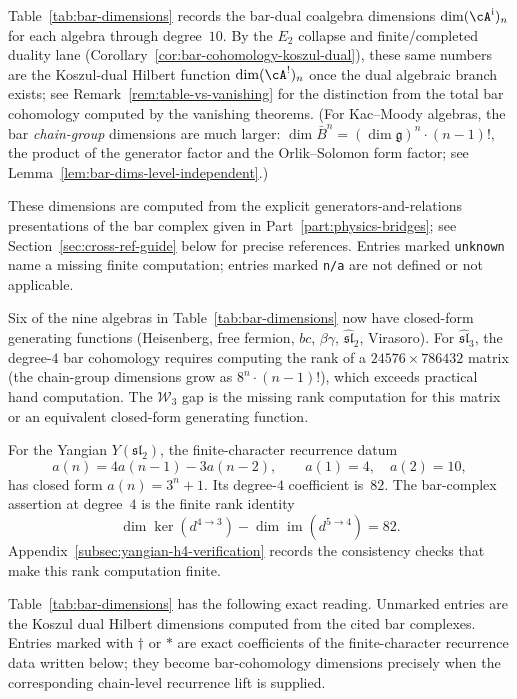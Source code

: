 Table~\ref{tab:bar-dimensions} records the bar-dual coalgebra dimensions
$\dim(\cA^{\mathrm i})_n$ for each algebra through degree~$10$.
By the $E_2$ collapse and finite/completed duality lane
(Corollary~\ref{cor:bar-cohomology-koszul-dual}), these same numbers are
the Koszul-dual Hilbert function $\dim(\cA^!)_n$ once the dual algebraic
branch exists; see
Remark~\ref{rem:table-vs-vanishing} for the distinction from the
total bar cohomology computed by the vanishing theorems.
(For Kac--Moody algebras, the bar \emph{chain-group} dimensions are much
larger: $\dim \bar{B}^n = (\dim\mathfrak{g})^n \cdot (n{-}1)!$,
the product of the generator factor and the Orlik--Solomon form
factor; see Lemma~\ref{lem:bar-dims-level-independent}.)

These dimensions are computed from the explicit
generators-and-relations
presentations of the bar complex given in Part~\ref{part:physics-bridges};
see Section~\ref{sec:cross-ref-guide} below for precise references.
Entries marked \texttt{unknown} name a missing finite computation;
entries marked \texttt{n/a} are not defined or not applicable.

Six of the nine algebras in Table~\ref{tab:bar-dimensions} now have
closed-form generating functions (Heisenberg, free fermion, $bc$,
$\beta\gamma$, $\widehat{\mathfrak{sl}}_2$, Virasoro).
For $\widehat{\mathfrak{sl}}_3$, the degree-$4$ bar cohomology
requires computing the rank of a $24576 \times 786432$ matrix
(the chain-group dimensions grow as $8^n \cdot (n{-}1)!$),
which exceeds practical hand computation. The $\mathcal{W}_3$ gap is
the missing rank computation for this matrix or an equivalent
closed-form generating function.

For the Yangian $Y(\mathfrak{sl}_2)$, the finite-character recurrence
datum
\[
a(n)=4a(n{-}1)-3a(n{-}2),\qquad a(1)=4,\quad a(2)=10,
\]
has closed form $a(n)=3^n+1$.  Its degree-$4$ coefficient is~$82$.
The bar-complex assertion at degree~$4$ is the finite rank identity
\[
\dim\ker(d^{4\to 3})-\dim\operatorname{im}(d^{5\to 4})=82.
\]
Appendix~\ref{subsec:yangian-h4-verification} records the consistency
checks that make this rank computation finite.

\begin{proposition}
\label{prop:bar-dimensions-under-data}
Table~\textup{\ref{tab:bar-dimensions}} has the following exact reading.
Unmarked entries are the Koszul dual Hilbert dimensions computed from
the cited bar complexes. Entries marked with $\dagger$ or $*$ are exact
coefficients of the finite-character recurrence data written below; they
become bar-cohomology dimensions precisely when the corresponding
chain-level recurrence lift is supplied.
\end{proposition}

